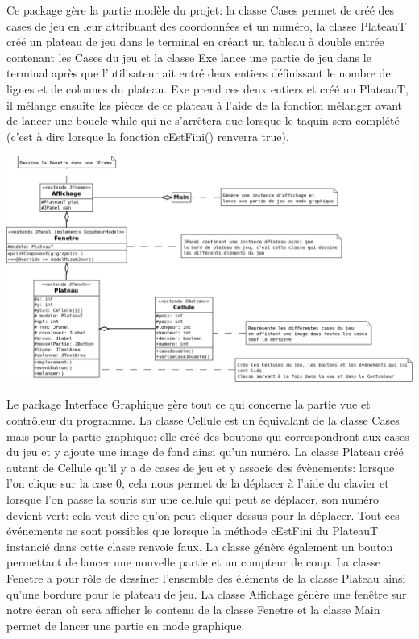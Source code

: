 \documentclass[12pt]{article}
\begin{document}
Ce package gère la partie modèle du projet: la classe Cases permet de créé des cases de jeu en leur attribuant des coordonnées et un numéro, la classe PlateauT créé un plateau de jeu dans le terminal en créant un tableau à double entrée contenant les Cases du jeu et la classe Exe lance une partie de jeu dans le terminal après que l'utilisateur ait entré deux entiers définissant le nombre de lignes et de colonnes du plateau. Exe prend ces deux entiers et créé un PlateauT, il mélange ensuite les pièces de ce plateau à l'aide de la fonction mélanger avant de lancer une boucle while qui ne s’arrêtera que lorsque le taquin sera complété (c'est à dire lorsque la fonction cEstFini() renverra true).


\begin{center}
\includegraphics[scale=0.3]{images/InterfaceGraphique.png}
\end{center}


Le package Interface Graphique gère tout ce qui concerne la partie vue et contrôleur du programme. La classe Cellule est un équivalant de la classe Cases mais pour la partie graphique: elle créé des boutons qui correspondront aux cases du jeu et y ajoute une image de fond ainsi qu'un numéro. La classe Plateau créé autant de Cellule qu'il y a de cases de jeu et y associe des évènements: lorsque l'on clique sur la case 0, cela nous permet de la déplacer à l'aide du clavier et lorsque l'on passe la souris sur une cellule qui peut se déplacer, son numéro devient vert: cela veut dire qu'on peut cliquer dessus pour la déplacer. Tout ces événements ne sont possibles que lorsque la méthode cEstFini du PlateauT instancié dans cette classe renvoie faux. La classe génère également un bouton permettant de lancer une nouvelle partie et un compteur de coup. La classe Fenetre a pour rôle de dessiner l'ensemble des éléments de la classe Plateau ainsi qu'une bordure pour le plateau de jeu. La classe Affichage génère une fenêtre sur notre écran où sera afficher le contenu de la classe Fenetre et la classe Main permet de lancer une partie en mode graphique.
\end{document}
